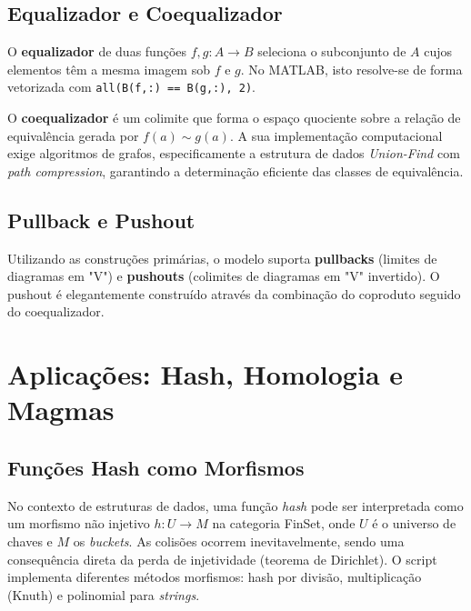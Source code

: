 \subsection{Equalizador e Coequalizador}
O \textbf{equalizador} de duas funções $f, g: A \to B$ seleciona o subconjunto de $A$ cujos elementos têm a mesma imagem sob $f$ e $g$. No MATLAB, isto resolve-se de forma vetorizada com \texttt{all(B(f,:) == B(g,:), 2)}.

O \textbf{coequalizador} é um colimite que forma o espaço quociente sobre a relação de equivalência gerada por $f(a) \sim g(a)$. A sua implementação computacional exige algoritmos de grafos, especificamente a estrutura de dados \textit{Union-Find} com \textit{path compression}, garantindo a determinação eficiente das classes de equivalência.

\subsection{Pullback e Pushout}
Utilizando as construções primárias, o modelo suporta \textbf{pullbacks} (limites de diagramas em "V") e \textbf{pushouts} (colimites de diagramas em "V" invertido). O pushout é elegantemente construído através da combinação do coproduto seguido do coequalizador.


\section{Aplicações: Hash, Homologia e Magmas}

\subsection{Funções Hash como Morfismos}
No contexto de estruturas de dados, uma função \textit{hash} pode ser interpretada como um morfismo não injetivo $h: U \to M$ na categoria FinSet, onde $U$ é o universo de chaves e $M$ os \textit{buckets}. As colisões ocorrem inevitavelmente, sendo uma consequência direta da perda de injetividade (teorema de Dirichlet). O script implementa diferentes métodos morfismos: hash por divisão, multiplicação (Knuth) e polinomial para \textit{strings}.


